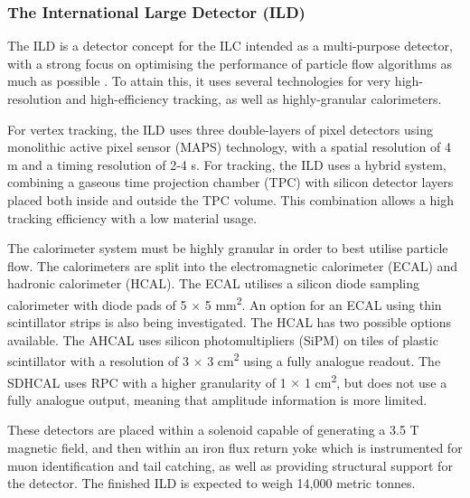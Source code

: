 \subsubsection{The International Large Detector (ILD)}

The \acrfull{ILD} is a detector concept for the \acrshort{ILC} intended as a multi-purpose detector, with a strong focus on optimising the performance of particle flow algorithms as much as possible \cite{ilc-tdr-detectors}. To attain this, it uses several technologies for very high-resolution and high-efficiency tracking, as well as highly-granular calorimeters.

For vertex tracking, the \acrshort{ILD} uses three double-layers of pixel detectors using monolithic active pixel sensor (\acrshort{MAPS}) technology, with a spatial resolution of 4 \textmu m and a timing resolution of 2-4 \textmu s. For tracking, the \acrshort{ILD} uses a hybrid system, combining a gaseous time projection chamber (\acrshort{TPC}) with silicon detector layers placed both inside and outside the \acrshort{TPC} volume. This combination allows a high tracking efficiency with a low material usage.

The calorimeter system must be highly granular in order to best utilise particle flow. The calorimeters are split into the electromagnetic calorimeter (\acrshort{ECAL}) and hadronic calorimeter (\acrshort{HCAL}). The \acrshort{ECAL} utilises a silicon diode sampling calorimeter with diode pads of 5 $\times$ 5 mm\textsuperscript{2}. An option for an ECAL using thin scintillator strips is also being investigated. The \acrshort{HCAL} has two possible options available. The \acrfull{AHCAL} uses silicon photomultipliers (\acrshort{SiPM}) on tiles of plastic scintillator with a resolution of 3 $\times$ 3 cm\textsuperscript{2} using a fully analogue readout. The \acrfull{SDHCAL} uses \acrfull{RPC} with a higher granularity of 1 $\times$ 1 cm\textsuperscript{2}, but does not use a fully analogue output, meaning that amplitude information is more limited. 

These detectors are placed within a solenoid capable of generating a 3.5 T magnetic field, and then within an iron flux return yoke which is instrumented for muon identification and tail catching, as well as providing structural support for the detector. The finished ILD is expected to weigh 14,000 metric tonnes.

%

